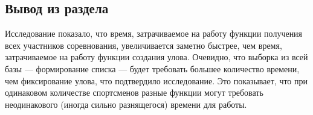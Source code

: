 \subsection{Вывод из раздела}

Исследование показало, что время, затрачиваемое на работу функции получения всех участников соревнования, увеличивается заметно быстрее, чем время, затрачиваемое на работу функции создания улова. Очевидно, что выборка из всей базы --- формирование списка --- будет требовать большее количество времени, чем фиксирование улова, что подтвердило исследование. Это показывает, что при одинаковом количестве спортсменов разные функции могут требовать неодинакового (иногда сильно разнящегося) времени для работы. 
